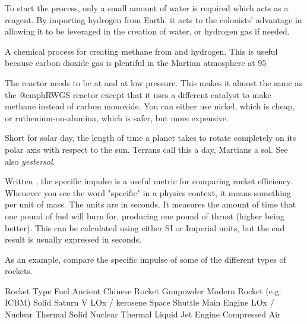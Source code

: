 {{To start the process, only a small amount of water is required which acts as a reagent. By importing hydrogen from Earth, it acts to the colonists' advantage in allowing it to be leveraged in the creation of water, or hydrogen gas if needed.

A chemical process for creating methane  from  and hydrogen. This is useful because carbon dioxide gas is plentiful in the Martian atmosphere at 95 %

\startformula
{}
\stopformula

The reactor needs to be at  and at low pressure. This makes it almost the same as the @emph{RWGS reactor} except that it uses a different catalyst to make methane instead of carbon monoxide. You can either use nickel, which is cheap, or ruthenium-on-alumina, which is safer, but more expensive.

Short for solar day, the length of time a planet takes to rotate completely on its polar axis with respect to the sun. Terrans call this a day, Martians a sol. See also {\it yestersol}.

Written , the specific impulse is a useful metric for comparing rocket efficiency. Whenever you see the word "specific" in a physics context, it means something per unit of mass. The units are in seconds. It measures the amount of time that one pound of fuel will burn for, producing one pound of thrust (higher being better). This can be calculated using either SI or Imperial units, but the end result is usually expressed in seconds. 

As an example, compare the specific impulse of some of the different types of rockets.

{
\bTABLE[split=repeat,option=stretch]%
\bTABLEhead
\bTR
  \bTH Rocket Type \eTH
  \bTH Fuel \eTH
  \bTH {} \eTH
\eTR
\eTABLEhead
\bTABLEbody
%
\bTR
  \bTC Ancient Chinese Rocket \eTC
  \bTC Gunpowder \eTC
   \eTC
\eTR
\bTR
  \bTC Modern Rocket (e.g. ICBM) \eTC
  \bTC Solid \eTC
   \eTC
\eTR
\bTR
  \bTC Saturn V \eTC
  \bTC LOx / kerosene \eTC
   \eTC
\eTR
\bTR
  \bTC Space Shuttle Main Engine \eTC
  \bTC LOx /  \eTC
   \eTC
\eTR
\bTR
  \bTC Nuclear Thermal \eTC
  \bTC Solid \eTC
   \eTC
\eTR
\bTR
  \bTC Nuclear Thermal \eTC
  \bTC Liquid \eTC
   \eTC
\eTR
\bTR
  \bTC Jet Engine \eTC
  \bTC Compressed Air \eTC
   \eTC
\eTR
\eTABLEbody
\eTABLE
}

}}
